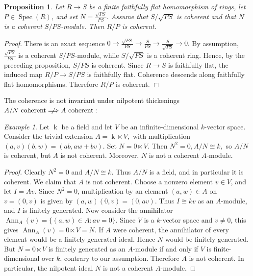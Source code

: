 \documentclass[10pt,a4paper]{amsart}
\newtheorem{proposition}[theorem]{Proposition}
\theoremstyle{definition}
\theoremstyle{remark}
\newtheorem{example}[theorem]{Example}
\newcommand{\kk}{\operatorname{k}}
\begin{document}
\begin{proposition}
	Let \(R\to S\) be a finite faithfully flat homomorphism of
	rings, let \(P\in\operatorname{Spec}(R)\), and set
 $
	N=\frac{\sqrt{PS}}{PS}.
	$ 	Assume that \(S/\sqrt{PS}\) is coherent and that \(N\) is a coherent
	\(S/PS\)-module. Then \(R/P\) is coherent.
\end{proposition}

\begin{proof}
	There is an exact sequence	
 $
	0\to
	\frac{\sqrt{PS}}{PS}
	\to
	\frac{S}{PS}
	\to
	\frac{S}{\sqrt{PS}}
	\to 0.
	$ By assumption,
$
	\frac{\sqrt{PS}}{PS}
	$ is a coherent \(S/PS\)-module, while
$
	S/\sqrt{PS}
	$ is a coherent ring. Hence, by the preceding proposition,
$
	S/PS
	$ is coherent.
	Since \(R\to S\) is faithfully flat, the induced map
$
	R/P\to S/PS
	$ 	is faithfully flat. Coherence descends along faithfully flat
	homomorphisms. Therefore \(R/P\) is coherent.
\end{proof}
The coherence is not invariant under nilpotent
thickenings $
A/N\text{ coherent}
\centernot\Longrightarrow
A\text{ coherent}:
$
\begin{example}
	Let \(\kk\) be a field and let \(V\) be an infinite-dimensional
	\(k\)-vector space. Consider the trivial extension
$
	A=\kk\ltimes V,
	$ with multiplication
$
	(a,v)(b,w)=(ab,aw+bv).
$
Set
$
	N=0\ltimes V.
	$ Then
 $
	N^2=0, A/N\cong k,
	$ so \(A/N\) is coherent, but \(A\) is not coherent.
	Moreover, \(N\) is not a coherent \(A\)-module.
\end{example}

\begin{proof}
	Clearly
$
	N^2=0
	$ and
$
	A/N\cong k.
	$ Thus \(A/N\) is a field, and in particular it is coherent.
 We claim that \(A\) is not coherent. Choose a nonzero element
	\(v\in V\), and let
 $
	I=Av.
	$
Since \(N^2=0\), multiplication by an element
	\((a,w)\in A\) on \(v=(0,v)\) is given by
$
	(a,w)(0,v)=(0,av).
$
Thus
$
	I\cong kv
$
as an \(A\)-module, and \(I\) is finitely generated.
Now consider the annihilator
$
	\operatorname{Ann}_A(v)
	=
	\{(a,w)\in A:av=0\}.
	$	Since \(V\) is a \(k\)-vector space and \(v\neq0\), this gives
$
	\operatorname{Ann}_A(v)=0\ltimes V=N.
	$	If \(A\) were coherent, the annihilator of every element would be a
	finitely generated ideal. Hence \(N\) would be finitely generated.
But \(N=0\ltimes V\) is finitely generated as an \(A\)-module if and
	only if \(V\) is finite-dimensional over \(k\), contrary to our
	assumption. Therefore \(A\) is not coherent.
	In particular, the nilpotent ideal \(N\) is not a coherent
	\(A\)-module.
\end{proof}
\end{document}
